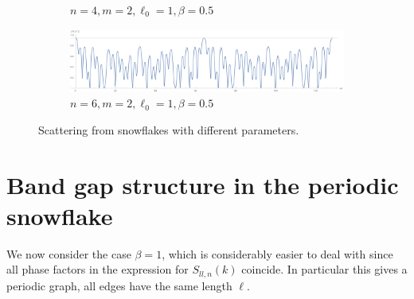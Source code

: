 \begin{figure}[!h]
\begin{subfigure}[t]{\textwidth}
    \caption{$n=4, m=2, \ell_0=1, \beta=0.5$}
  \end{subfigure}
  \begin{subfigure}[t]{\textwidth}
    \includegraphics[width=1\textwidth]{img/reflection_n=6_m=2_l=1_b=05_kmax=128pi}
    \caption{$n=6, m=2, \ell_0=1, \beta=0.5$}
  \end{subfigure}
  \caption{Scattering from snowflakes with different parameters.}
  \label{fig: snowflake reflection graphs}
\end{figure}

\clearpage




\section{Band gap structure in the periodic snowflake}

We now consider the case $\beta = 1$, which is considerably easier to deal with since all phase factors in the expression for $S_{ll,n}(k)$ coincide. In particular this gives a periodic graph, all edges have the same length $\ell$.


